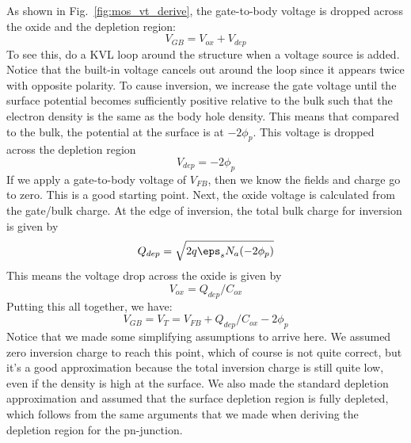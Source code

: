 As shown in Fig.~\ref{fig:mos_vt_derive}, the gate-to-body voltage is dropped across the oxide and the depletion region:
\begin{equation}
   V_{GB} = V_{ox} + V_{dep}
\end{equation}
To see this, do a KVL loop around the structure when a voltage source is added.   Notice that the built-in voltage cancels out around the loop since it appears twice with opposite polarity.   To cause inversion, we increase the gate voltage until the surface potential becomes sufficiently positive relative to the bulk such that the electron density is the same as the body hole density.  This means that compared to the bulk, the potential at the surface is at $-2\phi_p$.  This voltage is dropped across the depletion region
\begin{equation}
	V_{dep} = -2 \phi_p
\end{equation}
If we apply a gate-to-body voltage of $V_{FB}$, then we know the fields and charge go to zero. This is a good starting point.  Next, the oxide voltage is calculated from the gate/bulk charge.  At the edge of inversion, the total bulk charge for inversion is given by 
\begin{equation}
	Q_{dep} = \sqrt{2 q \eps_s N_a (-2 \phi_p) }
\end{equation}
This means the voltage drop across the oxide is given by
\begin{equation}
	V_{ox} = Q_{dep} / C_{ox} 
\end{equation}
Putting this all together, we have:
\begin{equation}
	V_{GB} = V_T = V_{FB} + Q_{dep}/C_{ox} - 2 \phi_p
\end{equation}
Notice that we made some simplifying assumptions to arrive here.  We assumed zero inversion charge to reach this point, which of course is not quite correct, but it's a good approximation because the total inversion charge is still quite low, even if the density is high at the surface.  We also made the standard depletion approximation and assumed that the surface depletion region is fully depleted, which follows from the same arguments that we made when deriving the depletion region for the pn-junction.
